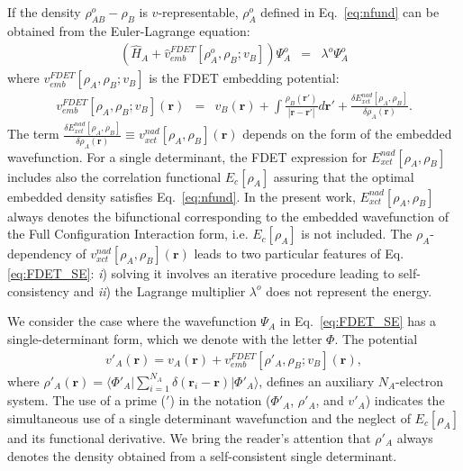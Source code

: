 \documentclass[amsmath,amssymb,preprint,aip,jcp]{revtex4-1}
\begin{document}
If the density $\rho^{o}_{AB}-\rho_{B}$ is $v$-representable, $\rho_A^{o}$ defined in Eq.~\ref{eq:nfund} can be obtained from the Euler-Lagrange equation:
\begin{eqnarray}
 \left( \hat{H}_A + \hat{v}_{emb}^{{FDET}}[\rho_A^{{o}}, \rho_B; v_B] \right) \Psi_A^{{o}} &=& \lambda^{o}\Psi_A^{{o}} \label{eq:FDET_SE} 
\end{eqnarray}
where $v_{emb}^{{FDET}}[\rho_A,\rho_B; v_B]$
is the FDET embedding potential:
\begin{eqnarray}
v_{emb}^{{FDET}}[\rho_A,\rho_B; v_B](\mathbf{r}) &=& v_B(\mathbf{r}) + \int \frac{\rho_B(\mathbf{r}')}{|\mathbf{r}-\mathbf{r}'|} d\mathbf{r}'+ \frac{\delta E_{xct}^{nad}[\rho_A,\rho_B]}{\delta\rho_A(\mathbf{r})}.
\label{eq:nFDET_embpot} 
\end{eqnarray}
The term $\frac{\delta E_{xct}^{nad}[\rho_A,\rho_B]}{\delta\rho_A(\mathbf{r})}\equiv v_{xct}^{nad}[\rho_A,\rho_B](\mathbf{r})$ depends on the form of the embedded wavefunction\cite{Wesolowski2008}.
For a single determinant, the FDET expression for $E_{xct}^{nad}[\rho_A,\rho_B]$ includes also the correlation functional $E_c[\rho_A]$ assuring that the optimal embedded density satisfies Eq.~\ref{eq:nfund}. 
In the present work, $E_{xct}^{nad}[\rho_A,\rho_B]$ always denotes the bifunctional corresponding to the embedded wavefunction of the Full Configuration Interaction form\cite{Wesolowski2008}, i.e. $E_c[\rho_A]$ is not included.
The $\rho_A$-dependency of $v_{xct}^{nad}[\rho_A,\rho_B](\mathbf{r})$ leads to two 
particular features of Eq. \ref {eq:FDET_SE}: {\it i}) solving it involves an iterative procedure leading to self-consistency\cite{Dulak2009} and {\it ii}) the Lagrange multiplier $\lambda^{o}$ does not represent the energy.\cite{Zech2016}

We consider the case where the wavefunction $\Psi_A$ in Eq.~\ref{eq:FDET_SE} has a single-determinant form, which we denote with the letter $\Phi$. 
The potential
\begin{eqnarray}
v'_A(\mathbf{r})=v_A(\mathbf{r})+v_{emb}^{{FDET}}[\rho'_A,\rho_B; v_B](\mathbf{r})\label{eq:def_v'},
\end{eqnarray}
where $\rho'_A(\mathbf{r})=\langle\Phi'_A\vert\sum_{i=1}^{N_{A}}\delta(\mathbf{r}_i-\mathbf{r})\vert\Phi'_A\rangle$, defines an auxiliary $N_A$-electron system. The use of a prime ($'$) in the notation ($\Phi'_A$, $\rho'_A$, and $v'_A$) indicates the simultaneous use of a single determinant wavefunction and the neglect of $E_c[\rho_A]$ and its functional derivative. We bring the reader's attention that $\rho'_A$ always denotes the density obtained from a self-consistent single determinant.
\end{document}
